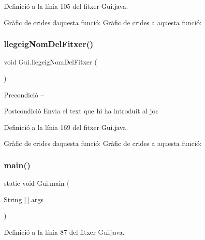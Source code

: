 Definició a la línia 105 del fitxer Gui.\+java.

Gràfic de crides d\textquotesingle{}aquesta funció\+:
Gràfic de crides a aquesta funció\+:
\mbox{\label{class_gui_a6bc8d9bda8f813b8d6c303ae798646b5}} 
\subsubsection{\texorpdfstring{llegeig\+Nom\+Del\+Fitxer()}{llegeigNomDelFitxer()}}
{\footnotesize\ttfamily void Gui.\+llegeig\+Nom\+Del\+Fitxer (\begin{DoxyParamCaption}{ }\end{DoxyParamCaption})\hspace{0.3cm}{\ttfamily [private]}}

\begin{DoxyPrecond}{Precondició}
-- 
\end{DoxyPrecond}
\begin{DoxyPostcond}{Postcondició}
Envia el text que hi ha introduit al joc 
\end{DoxyPostcond}


Definició a la línia 169 del fitxer Gui.\+java.

Gràfic de crides d\textquotesingle{}aquesta funció\+:
Gràfic de crides a aquesta funció\+:
\mbox{\label{class_gui_a147fb18eb48c8635f144795b1b3f79ad}} 
\subsubsection{\texorpdfstring{main()}{main()}}
{\footnotesize\ttfamily static void Gui.\+main (\begin{DoxyParamCaption}\item[{String \mbox{[}$\,$\mbox{]}}]{args }\end{DoxyParamCaption})\hspace{0.3cm}{\ttfamily [static]}}



Definició a la línia 87 del fitxer Gui.\+java.

\mbox{\label{class_gui_a6d292368ff728ae4d4b50d90273bf14c}} 
